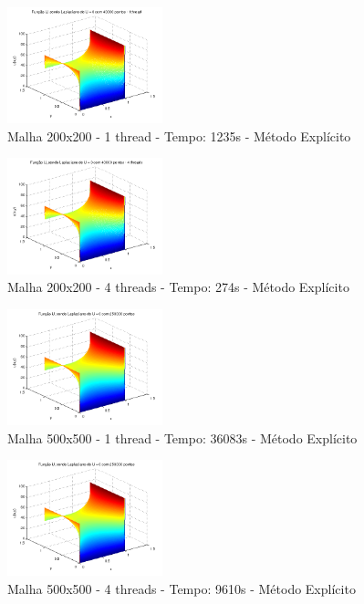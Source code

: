 \documentclass[journal]{IEEEtran}
\begin{document}
\begin{figure}[ht!]

\centering
\includegraphics[width = 0.4\textwidth]{figures/problema01_m1/13.png}
\caption{Malha 200x200 - 1 thread - Tempo: 1235s - Método Explícito\label{malha200x200_1th}}
\end{figure}

\newpage
\begin{figure}[ht!]

\centering
\includegraphics[width = 0.4\textwidth]{figures/problema01_m1/14.png}
\caption{Malha 200x200 - 4 threads - Tempo: 274s - Método Explícito\label{malha200x200_4th}}
\end{figure}

\begin{figure}[ht!]

\centering
\includegraphics[width = 0.4\textwidth]{figures/problema01_m1/06.png}
\caption{Malha 500x500 - 1 thread - Tempo: 36083s - Método Explícito\label{malha500x500_1th}}
\end{figure}

\begin{figure}[ht!]

\centering
\includegraphics[width = 0.4\textwidth]{figures/problema01_m1/15.png}
\caption{Malha 500x500 - 4 threads - Tempo: 9610s - Método Explícito\label{malha500x500_4th}}
\end{figure}
\end{document}
